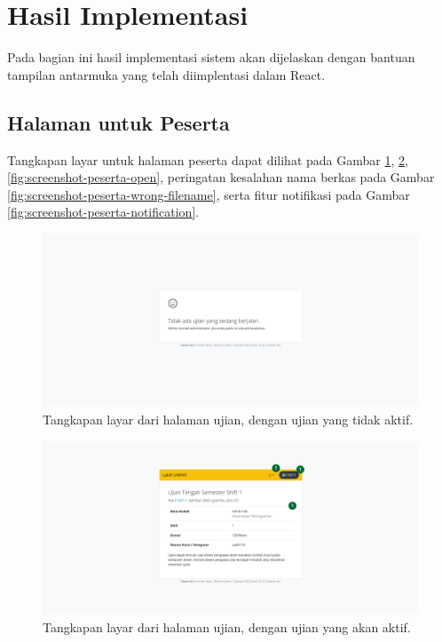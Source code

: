 \section{Hasil Implementasi}
    Pada bagian ini hasil implementasi sistem akan dijelaskan dengan bantuan tampilan antarmuka yang telah
    diimplentasi dalam React.
    
    \subsection{Halaman untuk Peserta}
        Tangkapan layar untuk halaman peserta dapat dilihat pada Gambar \ref{fig:screenshot-peserta-blankstate},
        \ref{fig:screenshot-peserta-standby}, \ref{fig:screenshot-peserta-open}, peringatan kesalahan
        nama berkas pada Gambar \ref{fig:screenshot-peserta-wrong-filename}, serta fitur notifikasi pada Gambar
        \ref{fig:screenshot-peserta-notification}.
        
        \begin{figure}
            \centering
            \includegraphics[width=0.7\paperwidth]{Gambar/implemented-interface/peserta/exam-empty.png}
            \caption{Tangkapan layar dari halaman ujian, dengan ujian yang tidak aktif.}
            \label{fig:screenshot-peserta-blankstate}
        \end{figure}
        
        \begin{figure}
            \centering
            \includegraphics[width=0.7\paperwidth]{Gambar/implemented-interface/peserta/exam-standby.png}
            \caption{Tangkapan layar dari halaman ujian, dengan ujian yang akan aktif.}
            \label{fig:screenshot-peserta-standby}
        \end{figure}
        
